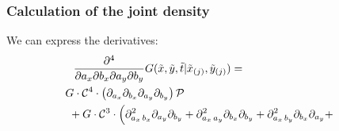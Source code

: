 \documentclass{beamer}
\begin{document}
\begin{frame}
  \frametitle{Calculation of the joint density}
  We can express the derivatives:
\begin{align*}
  \frac{\partial^4}{\partial a_x \partial b_x \partial a_y \partial b_y} G(\tilde{x},\tilde{y},\tilde{t} |  \tilde{x}_{(j)}, \tilde{y}_{(j)}) &= \\
  \MoveEqLeft[15] G \cdot \mathcal{C}^4 \cdot \left(\partial_{a_x}\partial_{b_x} \partial_{a_y}\partial_{b_y} \right)\mathcal{P}&  \nonumber \\
  \MoveEqLeft[15] \,\, + G \cdot \mathcal{C}^3 \cdot \left( \partial^2_{a_x\, b_x} \partial_{a_y} \partial_{b_y} + \partial^2_{a_x\, a_y} \partial_{b_x} \partial_{b_y} + \partial^2_{a_x\, b_y} \partial_{b_x} \partial_{a_y} + \right. &\nonumber \\

\end{align*}
\end{frame}
\end{document}
